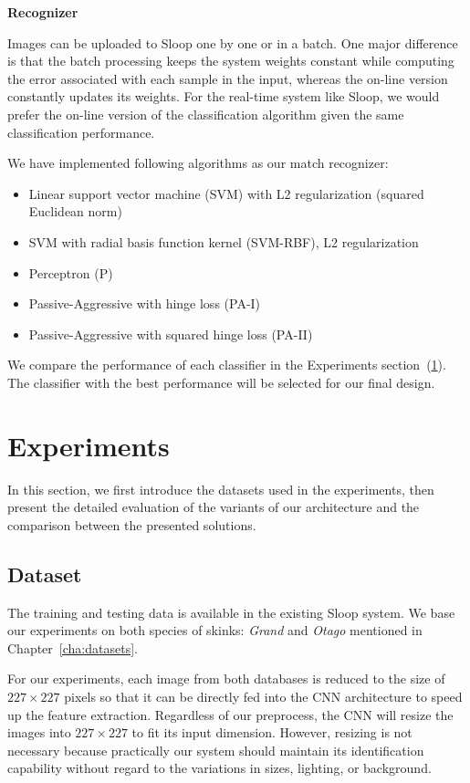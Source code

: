 \textbf{Recognizer}

Images can be uploaded to Sloop one by one or in a batch. One major difference
is that the batch processing keeps the system weights constant while computing
the error associated with each sample in the input, whereas the on-line version
constantly updates its weights. For the real-time system like Sloop, we would
prefer the on-line version of the classification algorithm given the same
classification performance.

We have implemented following algorithms as our match recognizer:
\begin{itemize}
  \item Linear support vector machine (SVM) with L2 regularization (squared
    Euclidean norm)
  \item SVM with radial basis function kernel (SVM-RBF), L2 regularization
  \item Perceptron (P)
  \item Passive-Aggressive with hinge loss (PA-I)
  \item Passive-Aggressive with squared hinge loss (PA-II)
\end{itemize}

We compare the performance of each classifier in the Experiments
section~(\ref{sec:experiments}). The classifier with the best performance will be
selected for our final design.

\section{Experiments} %
\label{sec:experiments}

In this section, we first introduce the datasets used in the experiments, then
present the detailed evaluation of the variants of our architecture and the
comparison between the presented solutions.

\subsection{Dataset}

The training and testing data is available in the existing Sloop system. We
base our experiments on both species of skinks: \emph{Grand} and \emph{Otago}
mentioned in Chapter~\ref{cha:datasets}.

For our experiments, each image from both databases is reduced to the size of
$227 \times 227$ pixels so that it can be directly fed into the CNN
architecture to speed up the feature extraction. Regardless of our preprocess,
the CNN will resize the images into $227 \times 227$ to fit its input
dimension. However, resizing is not necessary because practically our system
should maintain its identification capability without regard to the variations
in sizes, lighting, or background.

